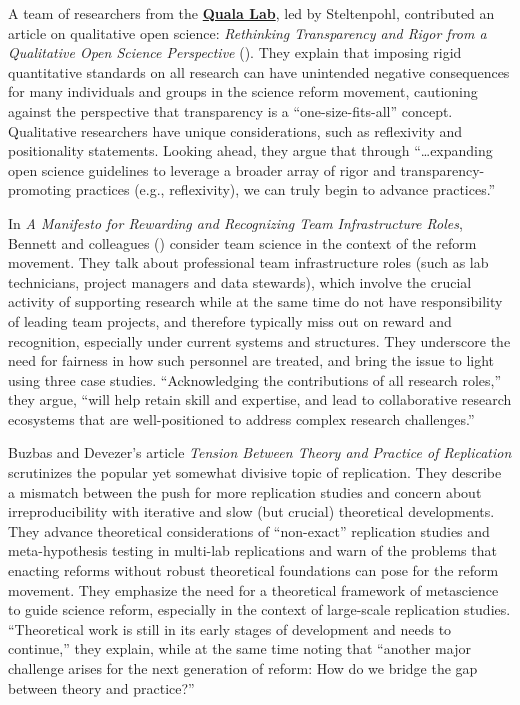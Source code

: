 \documentclass[authordate, editorial, noabstract, issue]{jote-new-article}
\begin{document}
A team of researchers from the \textbf{\href{https://qualalab.org/}{Quala Lab}}, led by Steltenpohl, contributed an article on qualitative open science: \emph{Rethinking Transparency and Rigor from a Qualitative Open Science Perspective} (\hspace*{-2pt}\citeyear{Steltenpohl2023}). They explain that imposing rigid quantitative standards on all research can have unintended negative consequences for many individuals and groups in the science reform movement, cautioning against the perspective that transparency is a “one-size-fits-all” concept. Qualitative researchers have unique considerations, such as reflexivity and positionality statements. Looking ahead, they argue that through “…expanding open science guidelines to leverage a broader array of rigor and transparency-promoting practices (e.g., reflexivity), we can truly begin to advance practices.”



In \emph{A Manifesto for Rewarding and Recognizing Team Infrastructure Roles}, Bennett and colleagues (\hspace*{-2pt}\citeyear{Bennett2023}) consider team science in the context of the reform movement. They talk about professional team infrastructure roles (such as lab technicians, project managers and data stewards), which involve the crucial activity of supporting research while at the same time do not have responsibility of leading team projects, and therefore typically miss out on reward and recognition, especially under current systems and structures. They underscore the need for fairness in how such personnel are treated, and bring the issue to light using three case studies. “Acknowledging the contributions of all research roles,” they argue, “will help retain skill and expertise, and lead to collaborative research ecosystems that are well-positioned to address complex research challenges.”



Buzbas and Devezer's \hspace*{-2pt}\citeyear{Buzbas2023} article \emph{Tension Between Theory and Practice of Replication} scrutinizes the popular yet somewhat divisive topic of replication. They describe a mismatch between the push for more replication studies and concern about irreproducibility with iterative and slow (but crucial) theoretical developments. They advance theoretical considerations of “non-exact” replication studies and meta-hypothesis testing in multi-lab replications and warn of the problems that enacting reforms without robust theoretical foundations can pose for the reform movement. They emphasize the need for a theoretical framework of metascience to guide science reform, especially in the context of large-scale replication studies. “Theoretical work is still in its early stages of development and needs to continue,” they explain, while at the same time noting that “another major challenge arises for the next generation of reform: How do we bridge the gap between theory and practice?”
\end{document}

